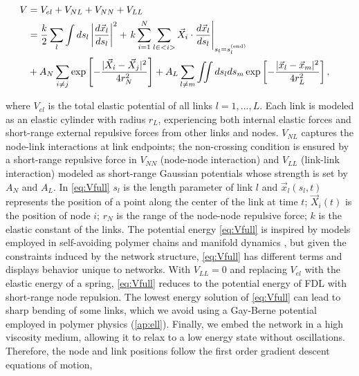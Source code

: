 \documentclass[endfloats,nofootinbib,preprint,floatfix,titlepage,superscriptaddress,linenumbers]{revtex4-1} %
\begin{document}
\begin{align}
    V &= V_{el} + V_{NL} +V_{NN} + V_{LL} \cr 
    &= {k\over 2}\sum_l\int ds_l \left|{d\vec{x}_l\over ds_l} \right|^2 + 
    \left. k\sum_{i=1}^N  \sum_{l\in <i>}  \vec{X}_i \cdot{d\vec{x}_l%
    \over ds_l}\right|_{s_l = s_l^{(\mathrm{end})}}
    \cr
    &+ A_N\sum_{i\ne j}  \exp\left[- {|\vec{X}_i-\vec{X}_j|^2 \over 4r_N^2}\right]+A_L\sum_{l\ne m} \iint ds_lds_m 
    \exp\left[- {|\vec{x}_l-\vec{x}_m|^2 \over 4 r_L^2}\right] ,
 \label{eq:Vfull}
\end{align}
\begin{linenumbers}
where $V_{el}$ is the total elastic potential of all links $l=1,...,L$. 
Each link is modeled as an elastic cylinder with radius $r_L$, experiencing both internal elastic forces and short-range external repulsive forces from other links and nodes. 
$V_{NL}$ captures the node-link interactions at link endpoints;
the non-crossing condition is ensured by a short-range repulsive force in
$V_{NN}$  (node-node interaction)  and  $V_{LL}$ (link-link interaction) modeled as short-range Gaussian potentials whose strength is set by $A_N$ and $A_L$. 
In \eqref{eq:Vfull} $s_l$ is the length parameter of link $l$ and  $\vec{x}_l(s_l,t)$ represents the position of a point along the center of the link at time $t$;
$\vec{X}_i(t)$ is the position of node $i$; $r_N$ is the range of the node-node repulsive force; $k$ is the elastic constant of the links.
{ 
The potential energy \eqref{eq:Vfull} is inspired by models employed in self-avoiding polymer chains \cite{des1974lagrangian} and manifold dynamics \cite{mezard1991replica}, but given the constraints induced by the network structure, \eqref{eq:Vfull} has different terms and displays behavior unique to networks. %
With $V_{LL}=0$ and replacing $V_{el}$ with the elastic energy of a spring, \eqref{eq:Vfull} reduces to the potential energy of FDL with short-range node repulsion. 
} 
The lowest energy solution of \eqref{eq:Vfull} can lead to sharp bending of some links, which we avoid using a Gay-Berne potential \cite{gay1981modification} %
employed in polymer physics %
\citep{everaers2003interaction,babadi2006coarse} (\ref{ap:ell}). 
Finally, we embed the network in a high viscosity medium, allowing it to relax to a low energy state without oscillations.
Therefore, the node and link positions follow the first order gradient descent equations of motion, 
\end{linenumbers}
\end{document}
